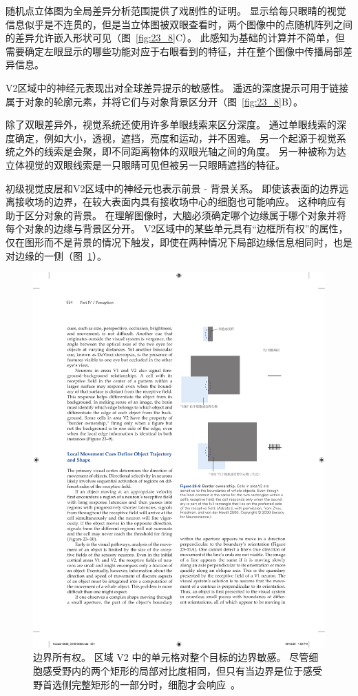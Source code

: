 随机点立体图为全局差异分析范围提供了戏剧性的证明。
显示给每只眼睛的视觉信息似乎是不连贯的，但是当立体图被双眼查看时，两个图像中的点随机阵列之间的差异允许嵌入形状可见（图~\ref{fig:23_8}C）。
此感知为基础的计算并不简单，但需要确定左眼显示的哪些功能对应于右眼看到的特征，并在整个图像中传播局部差异信息。


V2区域中的神经元表现出对全球差异提示的敏感性。 
遥远的深度提示可用于链接属于对象的轮廓元素，并将它们与对象背景区分开（图~\ref{fig:23_8}B）。


除了双眼差异外，视觉系统还使用许多单眼线索来区分深度。
通过单眼线索的深度确定，例如大小，透视，遮挡，亮度和运动，并不困难。
另一个起源于视觉系统之外的线索是会聚，即不同距离物体的双眼光轴之间的角度。
另一种被称为达立体视觉的双眼线索是一只眼睛可见但被另一只眼睛遮挡的特征。


初级视觉皮层和V2区域中的神经元也表示前景 - 背景关系。
即使该表面的边界远离接收场的边界，在较大表面内具有接收场中心的细胞也可能响应。
这种响应有助于区分对象的背景。
在理解图像时，大脑必须确定哪个边缘属于哪个对象并将每个对象的边缘与背景区分开。 
V2区域中的某些单元具有“边框所有权”的属性，仅在图形而不是背景的情况下触发，即使在两种情况下局部边缘信息相同时，也是对边缘的一侧（图~\ref{fig:23_9}）。


\begin{figure}[htbp]
	\centering
	\includegraphics[width=0.75\linewidth]{chap23/fig_23_9}
	\caption{边界所有权。
		区域 V2 中的单元格对整个目标的边界敏感。
		尽管细胞感受野内的两个矩形的局部对比度相同，但只有当边界是位于感受野首选侧完整矩形的一部分时，细胞才会响应~\cite{zhou2000coding}。}
	\label{fig:23_9}
\end{figure}



